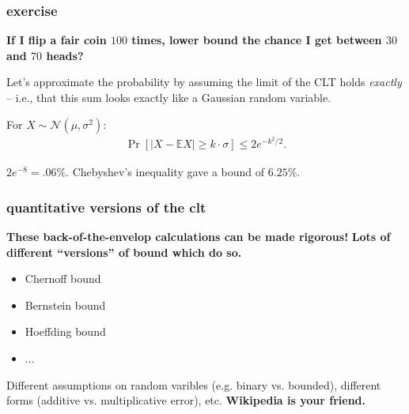 \documentclass[compress]{beamer}
\newcommand{\E}{\mathbb{E}}
\begin{document}
\begin{frame}
	\frametitle{exercise}
	\small 
	\begin{center}
		\textbf{If I flip a fair coin $100$ times, lower bound the chance I get between $30$ and $70$ heads?}
	\end{center}
	
	Let's approximate the probability by assuming the limit of the CLT holds \emph{exactly} -- i.e., that this sum looks exactly like a Gaussian random variable.
	\begin{lemma}
		For $X \sim \mathcal{N}(\mu,\sigma^2)$:\vspace{-.5em}
		\begin{align*}
			\Pr[|X - \E X| \geq k\cdot\sigma] \leq 2e^{-k^2/2}.
		\end{align*}
	\end{lemma}
	\vspace{5em}
	$2e^{-8} = .06\%$. Chebyshev's inequality gave a bound of $6.25\%$. 
\end{frame}



\begin{frame}
	\frametitle{quantitative versions of the clt}
	\textbf{These back-of-the-envelop calculations can be made rigorous!}
	\textbf{\alert{Lots of different ``versions'' of bound which do so.}}
		\begin{center}
			\begin{itemize}
				\item Chernoff bound
				\item Bernstein bound
				\item Hoeffding bound
				\item $\ldots$
			\end{itemize}
			Different assumptions on random varibles (e.g. binary vs. bounded), different forms (additive vs. multiplicative error), etc. \textbf{Wikipedia is your friend.}
		\end{center}
\end{frame}
\end{document}
